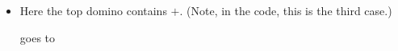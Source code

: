 \documentclass[12pt]{article}
\numberwithin{equation}{section}
\newcommand{\horizontalDominoMaybe}[3]{\filldraw [dominoMaybeStyle] (#2 - 1 + \eps, #1 - 1 + \eps) rectangle + (2 - \teps, 1 -\teps) node [dominoText] {$#3$};}
\newcommand{\verticalDominoMaybeShift}[4]{\filldraw [dominoMaybeStyle] (#2 - 1 + #4 + \eps,  #1 - 1 + \eps) rectangle + (1 - \teps,2 -\teps) node [dominoText] {$#3$};}
\begin{document}
\begin{itemize}
\begin{itemize}
\begin{itemize}
\begin{itemize}
\begin{figure}[H]
          \end{figure}
          \item Here the top domino contains $+$.
          (Note, in the code, this is the third case.)
          \begin{figure}[H]
            \centering
          \end{figure}
          goes to
          \begin{figure}[H]
            \centering
\end{figure}
\end{itemize}
\end{itemize}
\end{itemize}
\end{itemize}
\end{document}
